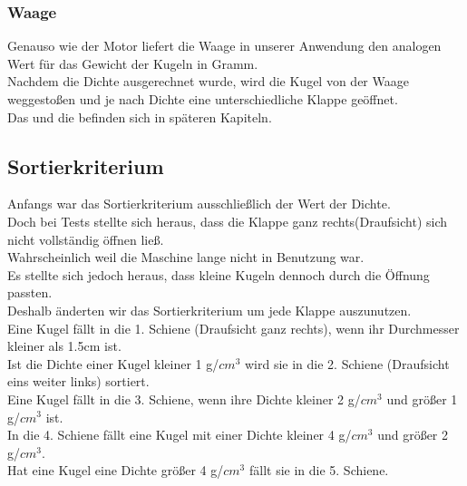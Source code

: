 \subsubsection{Waage}
Genauso wie der Motor liefert die Waage in unserer Anwendung den analogen Wert für das Gewicht der Kugeln in Gramm.\\
Nachdem die Dichte ausgerechnet wurde, wird die Kugel von der Waage weggestoßen und je nach Dichte eine unterschiedliche Klappe geöffnet.\\
Das  und die  befinden sich in späteren Kapiteln.\\
\clearpage

\subsection{Sortierkriterium}\label{Sortierkriterium}
Anfangs war das Sortierkriterium ausschließlich der Wert der Dichte.\\
Doch bei Tests stellte sich heraus, dass die Klappe ganz rechts(Draufsicht) sich nicht vollständig öffnen ließ.\\ 
Wahrscheinlich weil die Maschine lange nicht in Benutzung war.\\
Es stellte sich jedoch heraus, dass kleine Kugeln dennoch durch die Öffnung passten.\\
Deshalb änderten wir das Sortierkriterium um jede Klappe auszunutzen.\\
Eine Kugel fällt in die 1. Schiene (Draufsicht ganz rechts), wenn ihr Durchmesser kleiner als 1.5cm ist.\\
Ist die Dichte einer Kugel kleiner 1 g/$cm^3$ wird sie in die 2. Schiene (Draufsicht eins weiter links) sortiert.\\
Eine Kugel fällt in die 3. Schiene, wenn ihre Dichte kleiner 2 g/$cm^3$ und größer 1 g/$cm^3$ ist.\\
In die 4. Schiene fällt eine Kugel mit einer Dichte kleiner 4 g/$cm^3$ und größer 2 g/$cm^3$.\\
Hat eine Kugel eine Dichte größer 4 g/$cm^3$ fällt sie in die 5. Schiene.\\ 
\newpage

